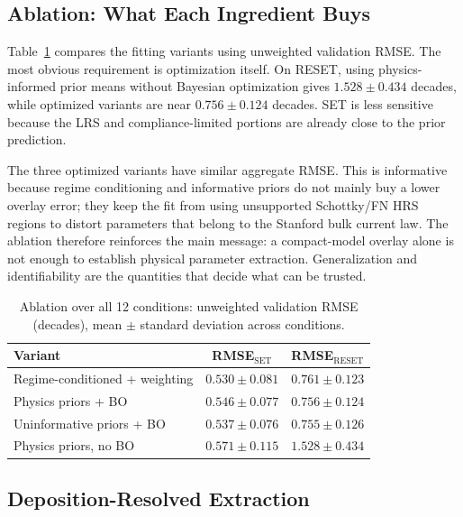 \documentclass[journal]{IEEEtran}
\begin{document}
\subsection{Ablation: What Each Ingredient Buys}
\label{sec:res-ablation}

Table~\ref{tab:ablation} compares the fitting variants using unweighted
validation RMSE.  The most obvious requirement is optimization itself.  On
RESET, using physics-informed prior means without Bayesian optimization gives
$1.528\pm0.434$ decades, while optimized variants are near
$0.756\pm0.124$ decades.  SET is less sensitive because the LRS and
compliance-limited portions are already close to the prior prediction.

The three optimized variants have similar aggregate RMSE.  This is
informative because regime conditioning and informative priors do not mainly
buy a lower overlay error; they keep the fit from using
unsupported Schottky/FN HRS regions to distort parameters that belong to the
Stanford bulk current law.  The ablation therefore reinforces the main
message: a compact-model overlay alone is not enough to establish physical
parameter extraction.  Generalization and identifiability are the quantities
that decide what can be trusted.

\begin{table}[!t]
\centering
\caption{Ablation over all 12 conditions: unweighted validation RMSE
(decades), mean $\pm$ standard deviation across conditions.}
\label{tab:ablation}
\footnotesize
\begin{tabular}{@{}lcc@{}}
\toprule
Variant & RMSE$_{\mathrm{SET}}$ & RMSE$_{\mathrm{RESET}}$\\
\midrule
Regime-conditioned + weighting & $0.530\pm0.081$ & $0.761\pm0.123$\\
Physics priors + BO & $0.546\pm0.077$ & $0.756\pm0.124$\\
Uninformative priors + BO & $0.537\pm0.076$ & $0.755\pm0.126$\\
Physics priors, no BO & $0.571\pm0.115$ & $1.528\pm0.434$\\
\bottomrule
\end{tabular}
\end{table}

\subsection{Deposition-Resolved Extraction}
\label{sec:res-trends}
\end{document}
